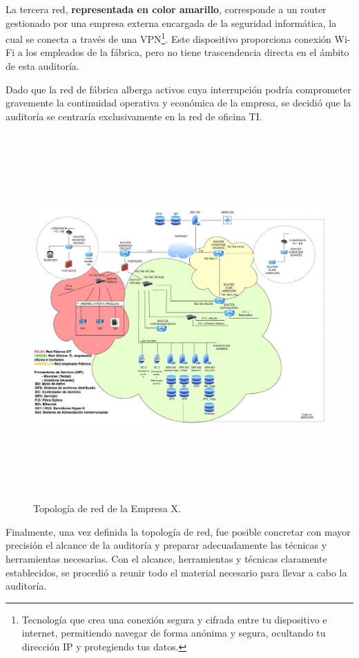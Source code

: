\documentclass[a4paper, 11pt]{article}
\begin{document}
La tercera red, \textbf{representada en color amarillo}, corresponde a un router gestionado por una empresa externa encargada de la seguridad informática, la cual se conecta a través de una VPN\footnote{Tecnología que crea una conexión segura y cifrada entre tu dispositivo e internet, permitiendo navegar de forma anónima y segura, ocultando tu dirección IP y protegiendo tus datos.}. Este dispositivo proporciona conexión Wi-Fi a los empleados de la fábrica, pero no tiene trascendencia directa en el ámbito de esta auditoría.

Dado que la red de fábrica alberga activos cuya interrupción podría comprometer gravemente la continuidad operativa y económica de la empresa, se decidió que la auditoría se centraría exclusivamente en la red de oficina TI.


\clearpage
\begin{landscape}
\begin{figure}[H]
  \centering
    \includegraphics[width=20cm,height=14cm]{images/topologia.png}
  \caption{Topología de red de la Empresa X.}
  \label{fig:topologia-red}
\end{figure}
\end{landscape}
\clearpage


Finalmente, una vez definida la topología de red, fue posible concretar con mayor precisión el alcance de la auditoría y preparar adecuadamente las técnicas y herramientas necesarias. Con el alcance, herramientas y técnicas claramente establecidos, se procedió a reunir todo el material necesario para llevar a cabo la auditoría.
\end{document}
